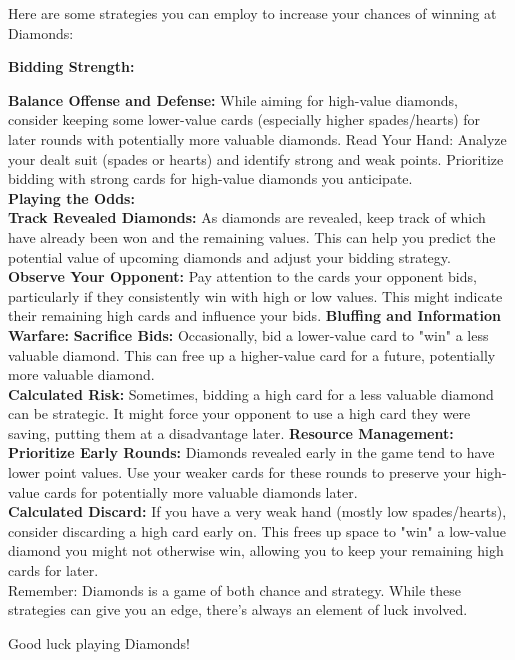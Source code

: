 \documentclass[runningheads]{llncs}
\begin{document}
\begin{thebibliography}{8}
Here are some strategies you can employ to increase your chances of winning at Diamonds:

\textbf{Bidding Strength:}

\textbf{Balance Offense and Defense:} While aiming for high-value diamonds, consider keeping some lower-value cards (especially higher spades/hearts) for later rounds with potentially more valuable diamonds.
Read Your Hand: Analyze your dealt suit (spades or hearts) and identify strong and weak points. Prioritize bidding with strong cards for high-value diamonds you anticipate.\\
\textbf{Playing the Odds:}\\

\textbf{Track Revealed Diamonds: }As diamonds are revealed, keep track of which have already been won and the remaining values. This can help you predict the potential value of upcoming diamonds and adjust your bidding strategy.\\
\textbf{Observe Your Opponent:} Pay attention to the cards your opponent bids, particularly if they consistently win with high or low values. This might indicate their remaining high cards and influence your bids.
\textbf{Bluffing and Information Warfare:
}
\textbf{Sacrifice Bids:} Occasionally, bid a lower-value card to "win" a less valuable diamond. This can free up a higher-value card for a future, potentially more valuable diamond.\\
\textbf{Calculated Risk:} Sometimes, bidding a high card for a less valuable diamond can be strategic. It might force your opponent to use a high card they were saving, putting them at a disadvantage later.
\textbf{Resource Management:}\\
\textbf{Prioritize Early Rounds:} Diamonds revealed early in the game tend to have lower point values. Use your weaker cards for these rounds to preserve your high-value cards for potentially more valuable diamonds later.\\
\textbf{Calculated Discard: }If you have a very weak hand (mostly low spades/hearts), consider discarding a high card early on. This frees up space to "win" a low-value diamond you might not otherwise win, allowing you to keep your remaining high cards for later.\\
Remember: Diamonds is a game of both chance and strategy. While these strategies can give you an edge, there's always an element of luck involved.

Good luck playing Diamonds!


\end{thebibliography}
\end{document}
